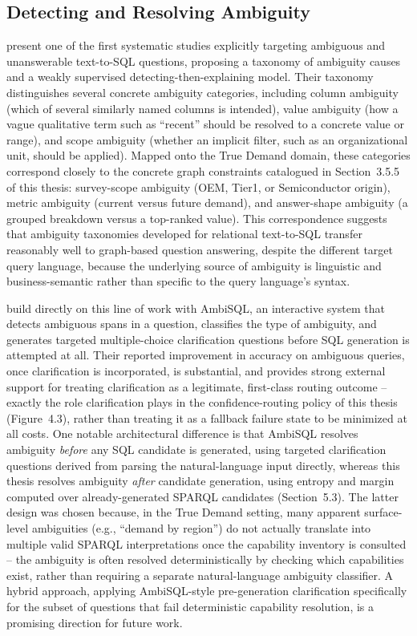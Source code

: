 \documentclass[
  12pt,
  english,
  oneside]{report}
\begin{document}
\subsection{Detecting and Resolving Ambiguity}

\citet{wang2023knowwhat} present one of the first systematic studies
explicitly targeting ambiguous and unanswerable text-to-SQL questions,
proposing a taxonomy of ambiguity causes and a weakly supervised
detecting-then-explaining model. Their taxonomy distinguishes several
concrete ambiguity categories, including column ambiguity (which of
several similarly named columns is intended), value ambiguity (how a
vague qualitative term such as ``recent'' should be resolved to a concrete
value or range), and scope ambiguity (whether an implicit filter, such as
an organizational unit, should be applied). Mapped onto the True Demand
domain, these categories correspond closely to the concrete graph
constraints catalogued in Section~3.5.5 of this thesis: survey-scope
ambiguity (OEM, Tier1, or Semiconductor origin), metric ambiguity
(current versus future demand), and answer-shape ambiguity (a grouped
breakdown versus a top-ranked value). This correspondence suggests that
ambiguity taxonomies developed for relational text-to-SQL transfer
reasonably well to graph-based question answering, despite the different
target query language, because the underlying source of ambiguity is
linguistic and business-semantic rather than specific to the query
language's syntax.

\citet{ding2025ambisql} build directly on this line of work with AmbiSQL,
an interactive system that detects ambiguous spans in a question,
classifies the type of ambiguity, and generates targeted multiple-choice
clarification questions before SQL generation is attempted at all. Their
reported improvement in accuracy on ambiguous queries, once clarification
is incorporated, is substantial, and provides strong external support for
treating clarification as a legitimate, first-class routing outcome --
exactly the role clarification plays in the confidence-routing policy of
this thesis (Figure~4.3), rather than treating it as a fallback failure
state to be minimized at all costs. One notable architectural difference
is that AmbiSQL resolves ambiguity \emph{before} any SQL candidate is
generated, using targeted clarification questions derived from parsing the
natural-language input directly, whereas this thesis resolves ambiguity
\emph{after} candidate generation, using entropy and margin computed over
already-generated SPARQL candidates (Section~5.3). The latter design was
chosen because, in the True Demand setting, many apparent surface-level
ambiguities (e.g., ``demand by region'') do not actually translate into
multiple valid SPARQL interpretations once the capability inventory is
consulted -- the ambiguity is often resolved deterministically by
checking which capabilities exist, rather than requiring a separate
natural-language ambiguity classifier. A hybrid approach, applying
AmbiSQL-style pre-generation clarification specifically for the subset of
questions that fail deterministic capability resolution, is a promising
direction for future work.
\end{document}
